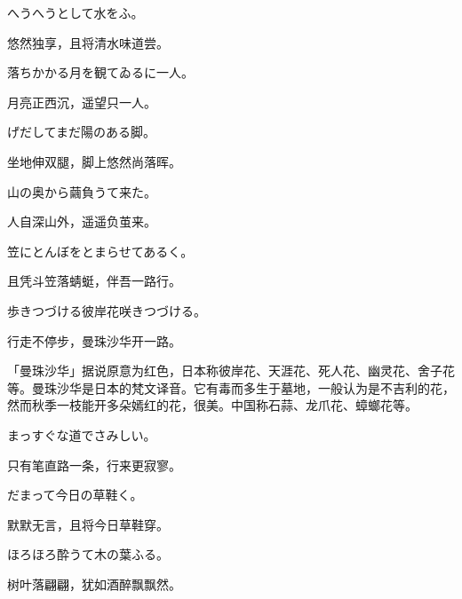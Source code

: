 \begin{haiku}
    {\FH へうへうとして水をふ。}

    {\FK 悠然独享，且将清水味道尝。}
\end{haiku}

\begin{haiku}
    {\FH 落ちかかる月を観てゐるに一人。}

    {\FK 月亮正西沉，遥望只一人。}
\end{haiku}

\begin{haiku}
    {\FH {}げだしてまだ陽のある脚。}

    {\FK 坐地伸双腿，脚上悠然尚落晖。}
\end{haiku}

\begin{haiku}
    {\FH 山の奥から繭負うて来た。}

    {\FK 人自深山外，遥遥负茧来。}
\end{haiku}

\begin{haiku}
    {\FH 笠にとんぼをとまらせてあるく。}

    {\FK 且凭斗笠落蜻蜓，伴吾一路行。}
\end{haiku}

\begin{haiku}
    {\FH 歩きつづける彼岸花咲きつづける。}

    {\FK 行走不停步，曼珠沙华开一路。}

    {\FS「曼珠沙华」据说原意为红色，日本称彼岸花、天涯花、死人花、幽灵花、舍子花等。曼珠沙华是日本的梵文译音。它有毒而多生于墓地，一般认为是不吉利的花，然而秋季一枝能开多朵嫣红的花，很美。中国称石蒜、龙爪花、蟑螂花等。}
\end{haiku}

\begin{haiku}
    {\FH まっすぐな道でさみしい。}

    {\FK 只有笔直路一条，行来更寂寥。}
\end{haiku}

\begin{haiku}
    {\FH だまって今日の草鞋く。}

    {\FK 默默无言，且将今日草鞋穿。}
\end{haiku}

\begin{haiku}
    {\FH ほろほろ酔うて木の葉ふる。}

    {\FK 树叶落翩翩，犹如酒醉飘飘然。}
\end{haiku}

